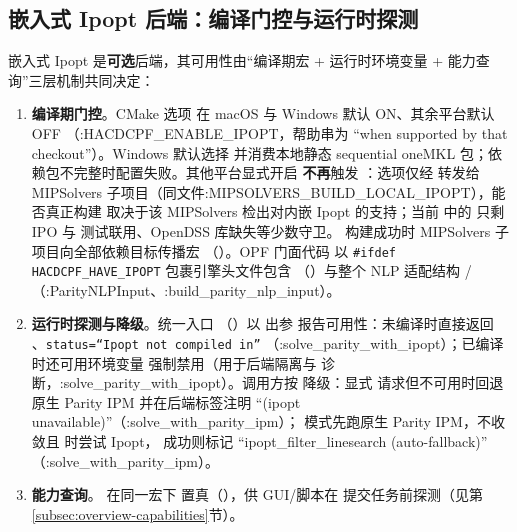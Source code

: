 \subsection{嵌入式 Ipopt 后端：编译门控与运行时探测}\label{subsec:overview-ipopt}

嵌入式 Ipopt 是\textbf{可选}后端，其可用性由“编译期宏 + 运行时环境变量 +
能力查询”三层机制共同决定：

\begin{enumerate}
  \item \textbf{编译期门控}。CMake 选项 
        在 macOS 与 Windows 默认 ON、其余平台默认 OFF
        （:HACDCPF\_ENABLE\_IPOPT，帮助串为
        ``when supported by that checkout''）。Windows 默认选择
         并消费本地静态
        sequential oneMKL 包；依赖包不完整时配置失败。其他平台显式开启
        \textbf{不再}触发 ：选项仅经
         转发给 MIPSolvers
        子项目（同文件:MIPSOLVERS\_BUILD\_LOCAL\_IPOPT），能否真正构建
        取决于该 MIPSolvers 检出对内嵌 Ipopt 的支持；当前
         中的  只剩 IPO 与
        测试联用、OpenDSS 库缺失等少数守卫。
        构建成功时 MIPSolvers 子项目向全部依赖目标传播宏
        （）。OPF 门面代码
        以 \texttt{\#ifdef HACDCPF\_HAVE\_IPOPT} 包裹引擎头文件包含
        （）与整个
        NLP 适配结构 /
        （:ParityNLPInput、:build\_parity\_nlp\_input）。
  \item \textbf{运行时探测与降级}。统一入口
        （）以
        出参  报告可用性：未编译时直接返回
        、\texttt{status=``Ipopt not compiled in''}
        （:solve\_parity\_with\_ipopt）；已编译时还可用环境变量
         强制禁用（用于后端隔离与
        诊断，:solve\_parity\_with\_ipopt）。调用方按  降级：显式
         请求但不可用时回退原生 Parity IPM 并在后端标签注明
        ``(ipopt unavailable)''（:solve\_with\_parity\_ipm）； 模式先跑原生
        Parity IPM，不收敛且  时尝试 Ipopt，
        成功则标记 ``ipopt\_filter\_linesearch (auto-fallback)''
        （:solve\_with\_parity\_ipm）。
  \item \textbf{能力查询}。 在同一宏下
        置真（），供 GUI/脚本在
        提交任务前探测（见第\ref{subsec:overview-capabilities}节）。
\end{enumerate}

